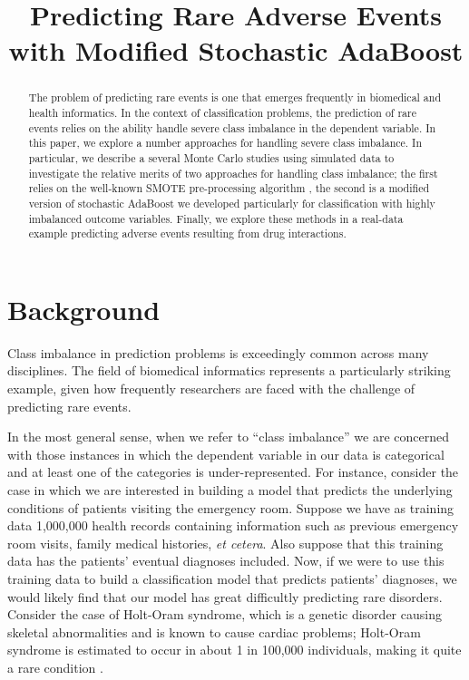 \documentclass[10pt]{article}
\title{\fontsize{14}{14} Predicting Rare Adverse Events with Modified Stochastic AdaBoost}
\author{}
\date{}
\begin{document}
\maketitle

\begin{abstract}
The problem of predicting rare events is one that emerges frequently in biomedical and health informatics. In the context of classification problems, the prediction of rare events relies on the ability handle severe class imbalance in the dependent variable. In this paper, we explore a number approaches for handling severe class imbalance. In particular, we describe a several Monte Carlo studies using simulated data to investigate the relative merits of two approaches for handling class imbalance; the first relies on the well-known SMOTE pre-processing algorithm \cite{chawla02}, the second is a modified version of stochastic AdaBoost we developed particularly for classification with highly imbalanced outcome variables. Finally, we explore these methods in a real-data example predicting adverse events resulting from drug interactions. 
\end{abstract}

\section{Background}

Class imbalance in prediction problems is exceedingly common across many disciplines. The field of biomedical informatics represents a particularly striking example, given how frequently researchers are faced with the challenge of predicting rare events. 

In the most general sense, when we refer to ``class imbalance'' we are concerned with those instances in which the dependent variable in our data is categorical and at least one of the categories is under-represented. For instance, consider the case in which we are interested in building a model that predicts the underlying conditions of patients visiting the emergency room. Suppose we have as training data 1,000,000 health records containing information such as previous emergency room visits, family medical histories, \textit{et cetera}. Also suppose that this training data has the patients' eventual diagnoses included. Now, if we were to use this training data to build a classification model that predicts patients' diagnoses, we would likely find that our model has great difficultly predicting rare disorders. Consider the case of Holt-Oram syndrome, which is a genetic disorder causing skeletal abnormalities and is known to cause cardiac problems; Holt-Oram syndrome is estimated to occur in about 1 in 100,000 individuals, making it quite a rare condition \cite{huang02}. 
\end{document}
